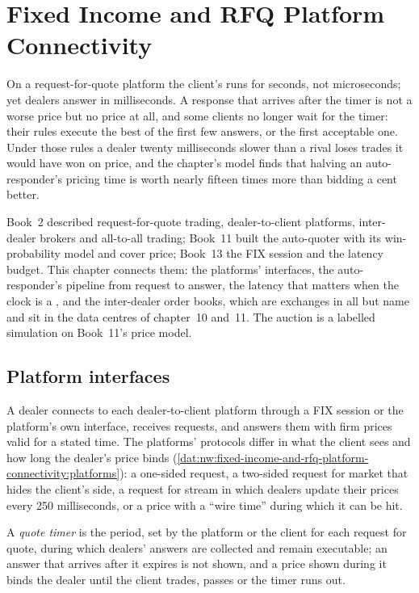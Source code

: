 \chapter{Fixed Income and RFQ Platform Connectivity}\label{ch:nw:fixed-income-and-rfq-platform-connectivity}

On a request-for-quote platform the client's  runs for seconds, not microseconds; yet dealers answer in
milliseconds. A response that arrives after the timer is not a worse price but no price at all, and some clients no longer
wait for the timer: their rules execute the best of the first few answers, or the first acceptable one. Under those rules a
dealer twenty milliseconds slower than a rival loses trades it would have won on price, and the chapter's model finds that
halving an auto-responder's pricing time is worth nearly fifteen times more than bidding a cent better.

Book~2 described request-for-quote trading, dealer-to-client platforms, inter-dealer brokers and all-to-all trading;
Book~11 built the auto-quoter with its win-probability model and cover price; Book~13 the FIX session and the latency budget.
This chapter connects them: the platforms' interfaces, the auto-responder's pipeline from request to answer, the latency that
matters when the clock is a , and the inter-dealer order books, which are exchanges in all but name and sit in the
data centres of chapter~10 and~11. The auction is a labelled simulation on Book~11's price model.

\section{Platform interfaces}

A dealer connects to each dealer-to-client platform through a FIX session or the platform's own interface, receives requests,
and answers them with firm prices valid for a stated time. The platforms' protocols differ in what the client sees and how long
the dealer's price binds (\cref{dat:nw:fixed-income-and-rfq-platform-connectivity:platforms}): a one-sided request, a two-sided
request for market that hides the client's side, a request for stream in which dealers update their prices every 250
milliseconds, or a price with a ``wire time'' during which it can be hit.

\begin{definition}\label{def:nw:fixed-income-and-rfq-platform-connectivity:timer}
A \emph{quote timer} is the period, set by the platform or the client for each request for quote, during
which dealers' answers are collected and remain executable; an answer that arrives after it expires is not shown, and a price
shown during it binds the dealer until the client trades, passes or the timer runs out.
\end{definition}

